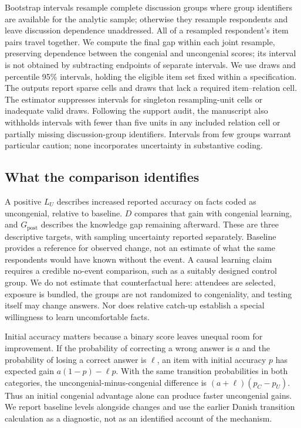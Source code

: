 Bootstrap intervals resample complete discussion groups where group identifiers are available for the analytic sample; otherwise they resample respondents and leave discussion dependence unaddressed. All of a resampled respondent's item pairs travel together. We compute the final gap within each joint resample, preserving dependence between the congenial and uncongenial scores; its interval is not obtained by subtracting endpoints of separate intervals. We use \comparativeDraws{} draws and percentile 95\% intervals, holding the eligible item set fixed within a specification. The outputs report sparse cells and draws that lack a required item--relation cell. The estimator suppresses intervals for singleton resampling-unit cells or inadequate valid draws. Following the support audit, the manuscript also withholds intervals with fewer than five units in any included relation cell or partially missing discussion-group identifiers. Intervals from few groups warrant particular caution; none incorporates uncertainty in substantive coding.

\subsection{What the comparison identifies}

A positive $L_U$ describes increased reported accuracy on facts coded as uncongenial, relative to baseline. $D$ compares that gain with congenial learning, and $G_{\mathrm{post}}$ describes the knowledge gap remaining afterward. These are three descriptive targets, with sampling uncertainty reported separately. Baseline provides a reference for observed change, not an estimate of what the same respondents would have known without the event. A causal learning claim requires a credible no-event comparison, such as a suitably designed control group. We do not estimate that counterfactual here: attendees are selected, exposure is bundled, the groups are not randomized to congeniality, and testing itself may change answers. Nor does relative catch-up establish a special willingness to learn uncomfortable facts.

Initial accuracy matters because a binary score leaves unequal room for improvement. If the probability of correcting a wrong answer is $a$ and the probability of losing a correct answer is $\ell$, an item with initial accuracy $p$ has expected gain $a(1-p)-\ell p$. With the same transition probabilities in both categories, the uncongenial-minus-congenial difference is $(a+\ell)(p_C-p_U)$. Thus an initial congenial advantage alone can produce faster uncongenial gains. We report baseline levels alongside changes and use the earlier Danish transition calculation as a diagnostic, not as an identified account of the mechanism.
